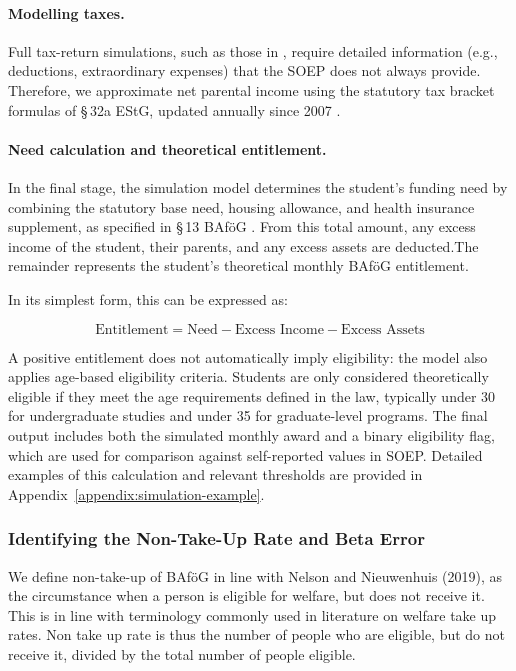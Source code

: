 \paragraph{Modelling taxes.}
Full tax-return simulations, such as those in \cite{herber_non-take-up_2019}, require detailed information (e.g., deductions, extraordinary expenses) that the SOEP does not always provide.  
Therefore, we approximate net parental income using the statutory tax bracket formulas of §\,32a EStG, updated annually since 2007 \citep{estg_law,estg_2025,estg_2024,estg_2023,estg_2022,estg_2021,estg_2020,estg_2019,estg_2018,estg_2017,estg_2016,estg_2015,estg_2014,estg_2013,estg_2012,estg_2007,estg_2006}.

\paragraph{Need calculation and theoretical entitlement.}
In the final stage, the simulation model determines the student's funding need by combining the statutory base need, housing allowance, and health insurance supplement, as specified in §\,13 BAföG \cite{bafoeg_law}. 
From this total amount, any excess income of the student, their parents, and any excess assets are deducted.The remainder represents the student's theoretical monthly BAföG entitlement. 

In its simplest form, this can be expressed as:

\begin{equation}
    \text{Entitlement} = \text{Need} - \text{Excess Income} - \text{Excess Assets}
\end{equation}

A positive entitlement does not automatically imply eligibility: the model also applies age-based eligibility criteria. 
Students are only considered theoretically eligible if they meet the age requirements defined in the law, typically under 30 for undergraduate studies and under 35 for graduate-level programs. 
The final output includes both the simulated monthly award and a binary eligibility flag, which are used for comparison against self-reported values in SOEP. 
Detailed examples of this calculation and relevant thresholds are provided in Appendix~\ref{appendix:simulation-example}.

\subsubsection{Identifying the Non-Take-Up Rate and Beta Error}
We define non-take-up of BAföG in line with Nelson and Nieuwenhuis (2019), as the circumstance when a person is eligible for welfare, but does not receive it. This is in line with terminology commonly used in literature on welfare take up rates. Non take up rate is thus the number of people who are eligible, but do not receive it, divided by the total number of people eligible. 


